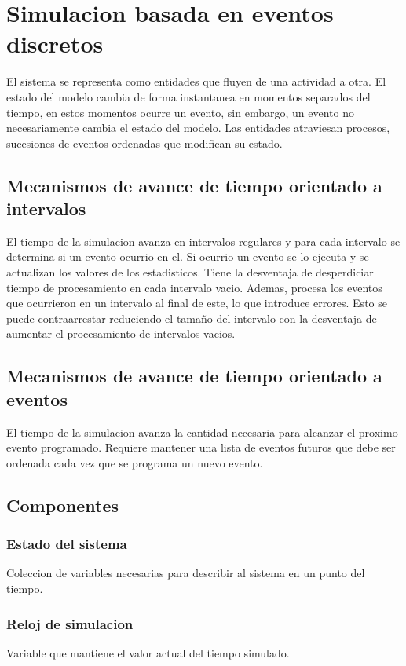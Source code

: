\documentclass[a4paper]{article}
\begin{document}
\section*{Simulacion basada en eventos discretos}
El sistema se representa como entidades que fluyen de una actividad a otra.
El estado del modelo cambia de forma instantanea en momentos separados del 
tiempo, en estos momentos ocurre un evento, sin embargo, un evento no 
necesariamente cambia el estado del modelo.
Las entidades atraviesan procesos, sucesiones de eventos ordenadas que modifican
su estado.

\subsection*{Mecanismos de avance de tiempo orientado a intervalos}
El tiempo de la simulacion avanza en intervalos regulares y para cada intervalo 
se determina si un evento ocurrio en el. Si ocurrio un evento se lo ejecuta y 
se actualizan los valores de los estadisticos.
Tiene la desventaja de desperdiciar tiempo de procesamiento en cada intervalo 
vacio. Ademas, procesa los eventos que ocurrieron en un intervalo al final de este, 
lo que introduce errores. Esto se puede contraarrestar reduciendo el tamaño del 
intervalo con la desventaja de aumentar el procesamiento de intervalos vacios.


\subsection*{Mecanismos de avance de tiempo orientado a eventos}
El tiempo de la simulacion avanza la cantidad necesaria para alcanzar el proximo
evento programado. Requiere mantener una lista de eventos futuros que debe ser ordenada cada vez que 
se programa un nuevo evento.

\subsection*{Componentes}
\subsubsection*{Estado del sistema}
Coleccion de variables necesarias para describir al sistema en un punto del tiempo.

\subsubsection*{Reloj de simulacion}
Variable que mantiene el valor actual del tiempo simulado.
\end{document}
